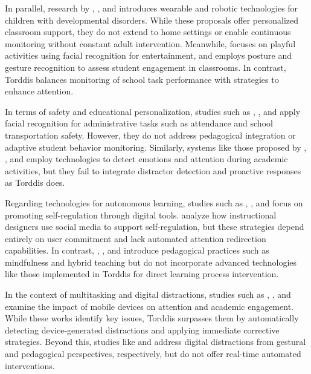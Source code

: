In parallel, research by \cite{Berrezueta-Guzman2021}, \cite{VilliersRader2021}, and \cite{Washington2016AWereable} introduces wearable and robotic technologies for children with developmental disorders. While these proposals offer personalized classroom support, they do not extend to home settings or enable continuous monitoring without constant adult intervention. Meanwhile, \cite{Muller2018ArchnSmile} focuses on playful activities using facial recognition for entertainment, and \cite{Nguyen2019} employs posture and gesture recognition to assess student engagement in classrooms. In contrast, Torddis balances monitoring of school task performance with strategies to enhance attention.

In terms of safety and educational personalization, studies such as \cite{Hachad2020}, \cite{James2019}, and \cite{Boumiza2017} apply facial recognition for administrative tasks such as attendance and school transportation safety. However, they do not address pedagogical integration or adaptive student behavior monitoring. Similarly, systems like those proposed by \cite{DaCosta2023}, \cite{Kumar2024Zoom}, and \cite{Narkhede2023} employ technologies to detect emotions and attention during academic activities, but they fail to integrate distractor detection and proactive responses as Torddis does.

Regarding technologies for autonomous learning, studies such as \cite{Bembich2016Future}, \cite{Roberts2020Task}, and \cite{Peters2003Self} focus on promoting self-regulation through digital tools. \cite{Muljana2022Instructional} analyze how instructional designers use social media to support self-regulation, but these strategies depend entirely on user commitment and lack automated attention redirection capabilities. In contrast, \cite{Palmer2022impact}, \cite{Adcroft2018Developing}, and \cite{Salter2014Exploring} introduce pedagogical practices such as mindfulness and hybrid teaching but do not incorporate advanced technologies like those implemented in Torddis for direct learning process intervention.

In the context of multitasking and digital distractions, studies such as \cite{Hartley2022Smartphone}, \cite{Labar2019Interplay}, and \cite{Farsani2020} examine the impact of mobile devices on attention and academic engagement. While these works identify key issues, Torddis surpasses them by automatically detecting device-generated distractions and applying immediate corrective strategies. Beyond this, studies like \cite{Erazo2016Easing} and \cite{Wang2022Empowering} address digital distractions from gestural and pedagogical perspectives, respectively, but do not offer real-time automated interventions.

